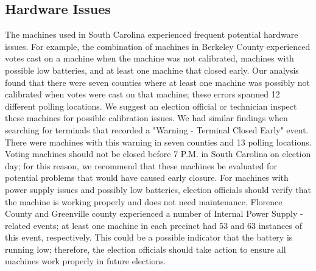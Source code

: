 \subsection{Hardware Issues}
The machines used in South Carolina experienced frequent potential hardware issues.  For example, the combination of machines in Berkeley County experienced votes cast on a machine when the machine was not calibrated, machines with possible low batteries, and at least one machine that closed early.  Our analysis found that there were seven counties where at least one machine was possibly not calibrated when votes were cast on that machine; these errors spanned 12 different polling locations.  We suggest an election official or technician inspect these machines for possible calibration issues.  We had similar findings when searching for terminals that recorded a "Warning - Terminal Closed Early" event.  There were machines with this warning in seven counties and 13 polling locations.  Voting machines should not be closed before 7 P.M. in South Carolina on election day; for this reason, we recommend that these machines be evaluated for potential problems that would have caused early closure.  For machines with power supply issues and possibly low batteries, election officials should verify that the machine is working properly and does not need maintenance.  Florence County and Greenville county experienced a number of Internal Power Supply - related events; at least one machine in each precinct had 53 and 63 instances of this event, respectively.  This could be a possible indicator that the battery is running low; therefore, the election officials should take action to ensure all machines work properly in future elections.

